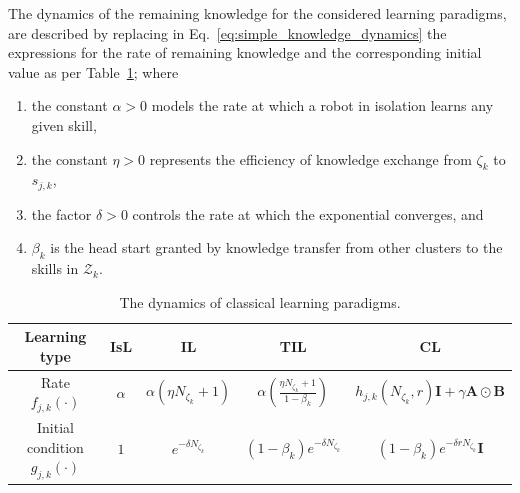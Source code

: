 \documentclass[12pt]{article}
\begin{document}
The dynamics of the remaining knowledge for the considered learning paradigms, are described by replacing in Eq.~\eqref{eq:simple_knowledge_dynamics} the expressions for the rate of remaining knowledge and the corresponding initial value as per Table~\ref{tab:learning_paradigms_expressions}; where
\begin{enumerate}
	\item the constant $ \alpha>0$ models the rate at which a robot in isolation learns any given skill,
	\item the constant $\eta>0$ represents the efficiency of knowledge exchange from $\zeta_k$ to $s_{j,k}$,
	\item the factor $\delta>0$ controls the rate at which the exponential converges, and
	\item $\beta_k$ is the head start granted by knowledge transfer from other clusters to the skills in $\mathcal{Z}_k$.
\end{enumerate}
\begin{table}[!ht]
	\caption{The dynamics of classical learning paradigms.\label{tab:learning_paradigms_expressions}}
	\begin{center}
		\begin{adjustbox}{width=\textwidth}
			\begin{tabular}{ |c|c|c|c|c|} 
				\hline
				Learning type & IsL & IL & TIL & CL  \\
				\hline
				Rate $f_{j,k}\left(\cdot \right)$ & $ \alpha$ & $ \alpha\left(\eta N_{\zeta_k} + 1 \right)$ & $\alpha \left( \frac{\eta N_{\zeta_k} + 1}{1 - \beta_k} \right)$ & $h_{j,k}\left(N_{\zeta_k},r\right) \bm{I} + \gamma \bm{A} \odot \bm{B}$ \\[5ex]
				\hline
				Initial condition $g_{j,k}\left(\cdot \right)$  & $1$ & $e^{-\delta N_{\zeta_k}}$ & $(1-\beta_k) e^{-\delta N_{\zeta_k}}$ & $(1-\beta_k) e^{-\delta r N_{\zeta_k}} \bm{I}$\\[5ex]
				\hline
			\end{tabular}
		\end{adjustbox}
	\end{center}	
\end{table}

\end{document}
